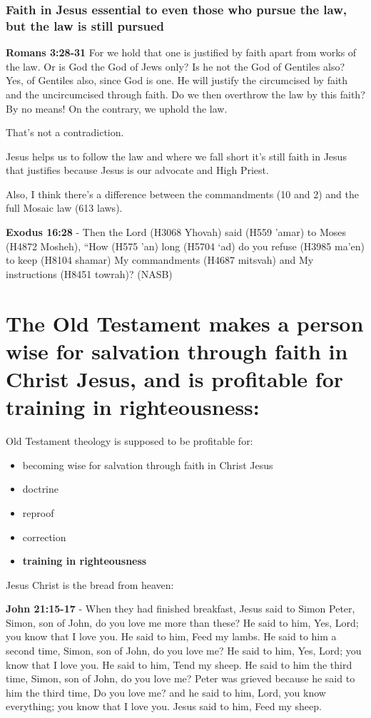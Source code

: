 \documentclass[11pt]{article}
\begin{document}
\subsubsection{Faith in Jesus essential to even those who pursue the law, but the law is still pursued}
\label{sec:org46581e9}
\textbf{Romans 3:28-31} For we hold that one is justified by faith apart from works of the law.  Or is God the God of Jews only? Is he not the God of Gentiles also? Yes, of Gentiles also, since God is one. He will justify the circumcised by faith and the uncircumcised through faith.  Do we then overthrow the law by this faith? By no means! On the contrary, we uphold the law.

That's not a contradiction.

Jesus helps us to follow the law and where we fall short it's still faith in Jesus that justifies because Jesus is our advocate and High Priest.

Also, I think there's a difference between the commandments (10 and 2) and the full Mosaic law (613 laws).

\textbf{Exodus 16:28} - Then the Lord (H3068 Yhovah) said (H559 'amar) to Moses (H4872 Mosheh), “How (H575 'an) long (H5704 `ad) do you refuse (H3985 ma'en) to keep (H8104 shamar) My commandments (H4687 mitsvah) and My instructions (H8451 towrah)? (NASB)

\section{The Old Testament makes a person wise for salvation through faith in Christ Jesus, and is profitable for training in righteousness:}
\label{sec:org42c61fe}

Old Testament theology is supposed to be profitable for:
\begin{itemize}
\item becoming wise for salvation through faith in Christ Jesus
\item doctrine
\item reproof
\item correction
\item \textbf{training in righteousness}
\end{itemize}

Jesus Christ is the bread from heaven:

\textbf{John 21:15-17} - When they had finished breakfast, Jesus said to Simon Peter, Simon, son of John, do you love me more than these? He said to him, Yes, Lord; you know that I love you. He said to him, Feed my lambs. He said to him a second time, Simon, son of John, do you love me? He said to him, Yes, Lord; you know that I love you. He said to him, Tend my sheep. He said to him the third time, Simon, son of John, do you love me? Peter was grieved because he said to him the third time, Do you love me? and he said to him, Lord, you know everything; you know that I love you. Jesus said to him, Feed my sheep.
\end{document}
